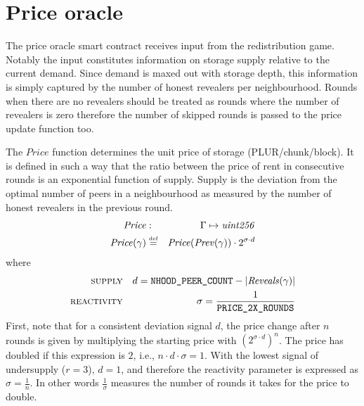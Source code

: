 \chapter{Price oracle}
\label{sec:appendix-price-oracle}

The price oracle smart contract receives input from the  redistribution game. Notably the input constitutes information on storage supply relative to the current demand. Since demand is maxed out with storage depth, this information is simply captured by the number of honest revealers per neighbourhood. Rounds when there are no revealers should be treated as rounds where the number of revealers is zero therefore the number of skipped rounds is passed to the price update function too.

\begin{definition}
\label{def:price-update-function}
The $\mathit{Price}$ function determines the unit price of storage (PLUR/chunk/block). It is defined in such a way that the ratio between the price of rent in consecutive rounds is an exponential function of supply. Supply is the deviation from the optimal number of peers in a neighbourhood as measured by the number of honest revealers in the previous round. 
\begin{eqnarray}
\mathit{Price}&:&\Gamma\mapsto\mathit{uint256}\\
\mathit{Price}(\gamma) &\overset{\textrm{\tiny def}}{=}&\mathit{Price}(\mathit{Prev}(\gamma))\cdot 2^{\sigma\cdot d}
\end{eqnarray}
where
\begin{eqnarray}
\textsc{supply} && d = \texttt{NHOOD\_PEER\_COUNT}-\lvert\mathit{Reveals}(\gamma)\rvert\\
\textsc{reactivity} && \sigma = \frac{1}{\texttt{PRICE\_2X\_ROUNDS}}
\end{eqnarray}
First, note that for a consistent deviation signal $d$, the price change after $n$ rounds is given by multiplying the starting price with $\left(2^{\sigma\cdot d}\right)^n$. The price has doubled if this expression is $2$, i.e., $n\cdot d\cdot \sigma =1$.  
With the lowest signal of undersupply ($r=3$), $d=1$, and therefore the reactivity parameter is expressed as $\sigma=\frac{1}{n}$. In other words $\frac{1}{\sigma}$ measures the number of rounds it takes for the price to double.
\end{definition}



